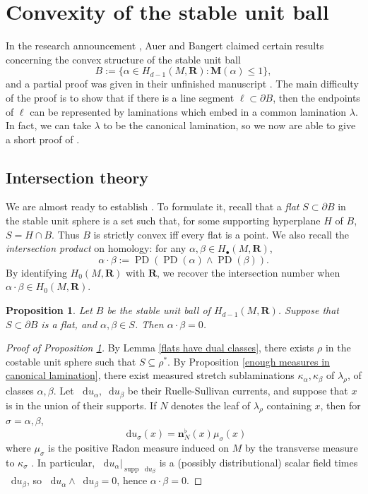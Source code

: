 \documentclass[reqno,11pt]{amsart}
\newcommand{\RR}{\mathbf{R}}
\newcommand*\dif{\mathop{}\!\mathrm{d}}
\DeclareMathOperator{\PD}{PD}
\DeclareMathOperator{\supp}{supp}
\newcommand{\normal}{\mathbf n}
\newcommand{\Mass}{\mathbf M}
\newcommand{\dfn}[1]{\emph{#1}\index{#1}}
\newtheorem{proposition}[theorem]{Proposition}
\theoremstyle{definition}
\numberwithin{equation}{section}
\begin{document}
\section{Convexity of the stable unit ball}\label{convexity sec}
In the research announcement \cite{Auer01}, Auer and Bangert claimed certain results concerning the convex structure of the stable unit ball
$$B := \{\alpha \in H_{d - 1}(M, \RR): \Mass(\alpha) \leq 1\},$$
and a partial proof was given in their unfinished manuscript \cite{Auer12}.
The main difficulty of the proof is to show that if there is a line segment $\ell \subset \partial B$, then the endpoints of $\ell$ can be represented by laminations which embed in a common lamination $\lambda$.
In fact, we can take $\lambda$ to be the canonical lamination, so we now are able to give a short proof of \cite[Theorems 6 and 7]{Auer01}.

\subsection{Intersection theory}
We are almost ready to establish \cite[Theorem 6]{Auer01}.
To formulate it, recall that a \dfn{flat} $S \subset \partial B$ in the stable unit sphere is a set such that, for some supporting hyperplane $H$ of $B$, $S = H \cap B$.
Thus $B$ is strictly convex iff every flat is a point.
We also recall the \dfn{intersection product} on homology: for any $\alpha, \beta \in H_\bullet(M, \RR)$,
$$\alpha \cdot \beta := \PD(\PD(\alpha) \wedge \PD(\beta)).$$
By identifying $H_0(M, \RR)$ with $\RR$, we recover the intersection number when $\alpha \cdot \beta \in H_0(M, \RR)$.

\begin{proposition}\label{flats are nonintersecting}
Let $B$ be the stable unit ball of $H_{d - 1}(M, \RR)$.
Suppose that $S \subset \partial B$ is a flat, and $\alpha, \beta \in S$.
Then $\alpha \cdot \beta = 0$.
\end{proposition}


\begin{proof}[Proof of Proposition \ref{flats are nonintersecting}]
By Lemma \ref{flats have dual classes}, there exists $\rho$ in the costable unit sphere such that $S \subseteq \rho^*$.
By Proposition \ref{enough measures in canonical lamination}, there exist measured stretch sublaminations $\kappa_\alpha, \kappa_\beta$ of $\lambda_\rho$, of classes $\alpha, \beta$.
Let $\dif u_\alpha, \dif u_\beta$ be their Ruelle-Sullivan currents, and suppose that $x$ is in the union of their supports.
If $N$ denotes the leaf of $\lambda_\rho$ containing $x$, then for $\sigma = \alpha, \beta$,
$$\dif u_\sigma(x) = \normal_N^\flat(x) \mu_\sigma(x)$$
where $\mu_\sigma$ is the positive Radon measure induced on $M$ by the transverse measure to $\kappa_\sigma$ \cite[Lemma 3.1]{BackusCML}.
In particular, $\dif u_\alpha|_{\supp \dif u_\beta}$ is a (possibly distributional) scalar field times $\dif u_\beta$, so $\dif u_\alpha \wedge \dif u_\beta = 0$, hence $\alpha \cdot \beta = 0$.
\end{proof}
\end{document}
